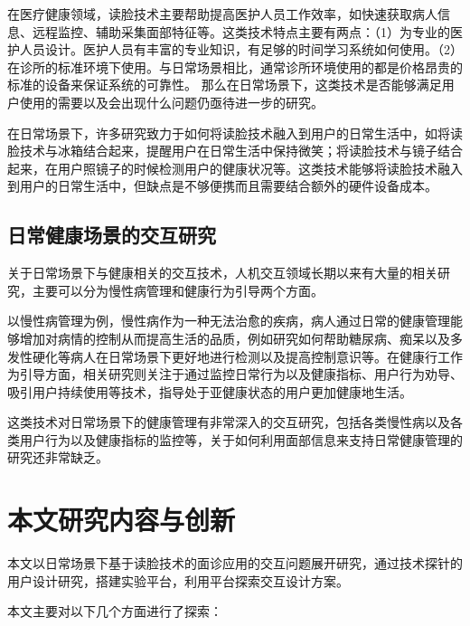 在医疗健康领域，读脸技术主要帮助提高医护人员工作效率，如快速获取病人信息\cite{nwosu2016mobile}、远程监控\cite{Hossain2015Cloud}、辅助采集面部特征\cite{张红凯2015中医面诊信息采集与识别方法研究进展}等。这类技术特点主要有两点：（1）为专业的医护人员设计。医护人员有丰富的专业知识，有足够的时间学习系统如何使用。（2）在诊所的标准环境下使用。与日常场景相比，通常诊所环境使用的都是价格昂贵的标准的设备来保证系统的可靠性。
那么在日常场景下，这类技术是否能够满足用户使用的需要以及会出现什么问题仍亟待进一步的研究。

在日常场景下，许多研究致力于如何将读脸技术融入到用户的日常生活中，如将读脸技术与冰箱结合起来，提醒用户在日常生活中保持微笑\cite{Tsujita2011Smiling}；将读脸技术与镜子结合起来，在用户照镜子的时候检测用户的健康状况\cite{andreu2015mirror}等。这类技术能够将读脸技术融入到用户的日常生活中，但缺点是不够便携而且需要结合额外的硬件设备成本。

\subsection{日常健康场景的交互研究}
关于日常场景下与健康相关的交互技术，人机交互领域长期以来有大量的相关研究，主要可以分为慢性病管理和健康行为引导两个方面。

以慢性病管理为例，慢性病作为一种无法治愈的疾病，病人通过日常的健康管理能够增加对病情的控制从而提高生活的品质，例如研究如何帮助糖尿病\cite{mamykina2008mahi}、痴呆\cite{yasuda2009remote}以及多发性硬化\cite{ayobi2017quantifying}等病人在日常场景下更好地进行检测以及提高控制意识等。在健康行工作为引导方面，相关研究则关注于通过监控日常行为\cite{purpura2011fit4life,Inagawa2013A,bravata2007using,cordeiro2015barriers,lin2006fish, miller2014stepstream}以及健康指标\cite{kay2012lullaby,gronvall2013beyond,logan2007mobile,walters2010a}、用户行为劝导、吸引用户持续使用等技术，指导处于亚健康状态的用户更加健康地生活。

这类技术对日常场景下的健康管理有非常深入的交互研究，包括各类慢性病以及各类用户行为以及健康指标的监控等，关于如何利用面部信息来支持日常健康管理的研究还非常缺乏。

\section{本文研究内容与创新}

本文以日常场景下基于读脸技术的面诊应用的交互问题展开研究，通过技术探针的用户设计研究，搭建实验平台，利用平台探索交互设计方案。

本文主要对以下几个方面进行了探索：

